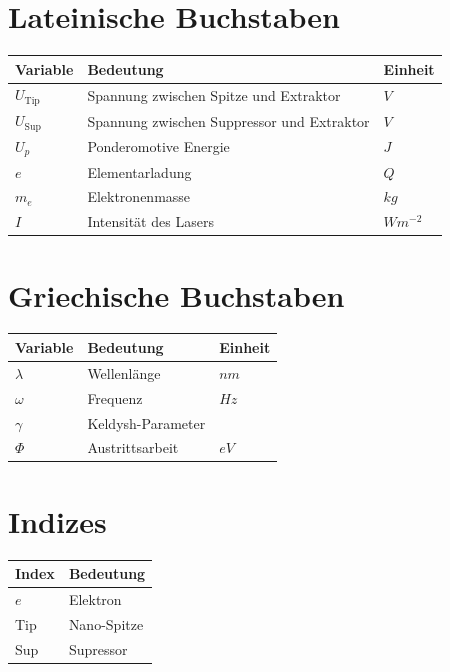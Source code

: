 \documentclass[bachelor,       %
               twoside,        %
               BCOR10mm,       %
               english,ngerman, %
               final,          %
               ]{GAUBM}
\newcommand{\tabheadfont}[1]{\textbf{#1}} %
\begin{document}
\cleardoublepage
\onehalfspacing
\tableofcontents

\begin{nomenclature}
\section*{Lateinische Buchstaben}
\noindent
\begin{longtable}[l]{p{}p{}p{}}
  \tabheadfont{Variable}&\tabheadfont{Bedeutung}&\tabheadfont{Einheit}\\\midrule\endhead
  $U_\text{Tip}$ & Spannung zwischen Spitze und Extraktor & $\unit{V}$\\
  $U_\text{Sup}$ & Spannung zwischen Suppressor und Extraktor & $\unit{V}$\\
  $U_p$ & Ponderomotive Energie & $\unit{J}$\\
  $e$ & Elementarladung & $\unit{Q}$\\
  $m_e$ & Elektronenmasse & $\unit{kg}$\\
  $I$ & Intensität des Lasers & $\unit{Wm^{-2}}$
\end{longtable}
\section*{Griechische Buchstaben}
\begin{longtable}[l]{p{}p{}p{}}
  \tabheadfont{Variable}&\tabheadfont{Bedeutung}&\tabheadfont{Einheit}\\\midrule\endhead
  $\lambda$ & Wellenlänge & $\unit{nm}$\\
  $\omega$ & Frequenz & $\unit{Hz}$\\
  $\gamma$  & Keldysh-Parameter & $\unit{}$\\
  $\Phi$ & Austrittsarbeit & $\unit{eV}$
\end{longtable}
\section*{Indizes}
\begin{longtable}[l]{p{}p{}}
  \tabheadfont{Index}&\tabheadfont{Bedeutung}\\\midrule\endhead
  $e$ & Elektron\\
  Tip & Nano-Spitze\\
  Sup & Supressor
\end{longtable}

\end{nomenclature}
\end{document}
